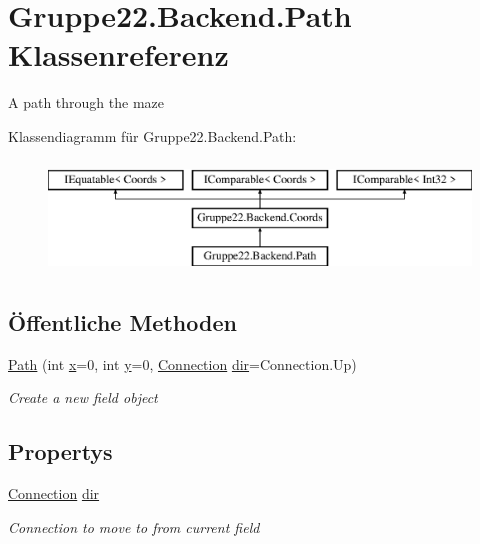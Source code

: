 \hypertarget{class_gruppe22_1_1_backend_1_1_path}{\section{Gruppe22.\-Backend.\-Path Klassenreferenz}
\label{class_gruppe22_1_1_backend_1_1_path}
}


A path through the maze  


Klassendiagramm für Gruppe22.\-Backend.\-Path\-:\begin{figure}[H]
\begin{center}
\leavevmode
\includegraphics[height=3.000000cm]{class_gruppe22_1_1_backend_1_1_path}
\end{center}
\end{figure}
\subsection*{Öffentliche Methoden}
\begin{DoxyCompactItemize}
\item 
\hyperlink{class_gruppe22_1_1_backend_1_1_path_a5e459046dd8613e5d532ed3ec9acbf51}{Path} (int \hyperlink{class_gruppe22_1_1_backend_1_1_coords_a5d6a2857d47b7fb03ff0fa9c07a41d11}{x}=0, int \hyperlink{class_gruppe22_1_1_backend_1_1_coords_a941b0ec77fa0973cc2faf35f9a6d85dd}{y}=0, \hyperlink{namespace_gruppe22_1_1_backend_a74373668761d179b11ba50e5980a8674}{Connection} \hyperlink{class_gruppe22_1_1_backend_1_1_path_ae0b10c76528f5435bfd460892b7c1801}{dir}=Connection.\-Up)
\begin{DoxyCompactList}\small\item\em Create a new field object \end{DoxyCompactList}\end{DoxyCompactItemize}
\subsection*{Propertys}
\begin{DoxyCompactItemize}
\item 
\hyperlink{namespace_gruppe22_1_1_backend_a74373668761d179b11ba50e5980a8674}{Connection} \hyperlink{class_gruppe22_1_1_backend_1_1_path_ae0b10c76528f5435bfd460892b7c1801}{dir}
\begin{DoxyCompactList}\small\item\em Connection to move to from current field \end{DoxyCompactList}\end{DoxyCompactItemize}
